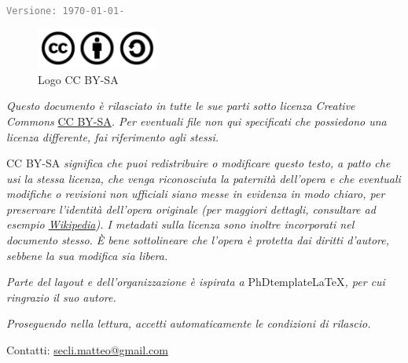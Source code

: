 \frontmatter
\renewcommand{\thepage}{\roman{page}}
\maketitle

\begin{footnotesize}
\null
  \begin{tiny}
  \texttt{\textcolor{gray}{Versione: \version\today-\microversion}}
  \end{tiny}
\vfill

\begin{figure}[hb]
\centering
\includegraphics[width=4cm]{00_frontmatter/figures/cc-by-sa}
\caption[Licenza]{Logo CC BY-SA}
\end{figure}

\emph{Questo documento è rilasciato in tutte le sue parti sotto licenza Creative Commons } \href{http://creativecommons.org/licenses/by-sa/3.0/deed.it}{CC BY-SA}\emph{. Per eventuali file non qui specificati che possiedono una licenza differente, fai riferimento agli stessi.}

CC BY-SA\emph{ significa che puoi redistribuire o modificare questo testo, a patto che usi la stessa licenza, che venga riconosciuta la paternità dell'opera e che eventuali modifiche o revisioni non ufficiali siano messe in evidenza in modo chiaro, per preservare l'identità dell'opera originale (per maggiori dettagli, consultare ad esempio \href{http://it.wikipedia.org/wiki/Licenze_Creative_Commons\#Attribuzione}{Wikipedia}). I metadati sulla licenza sono inoltre incorporati nel documento stesso. \`E bene sottolineare che l'opera è protetta dai diritti d'autore, sebbene la sua modifica sia libera.}

\emph{Parte del layout e dell'organizzazione è ispirata a }PhDtemplateLaTeX\emph{, per cui ringrazio il suo autore.}

\emph{Proseguendo nella lettura, accetti automaticamente le condizioni di rilascio.}

\vskip 10pt

Contatti:  \href{mailto:secli.matteo@gmail.com}{secli.matteo@gmail.com}
\end{footnotesize}

\tableofcontents


\mainmatter
\renewcommand{\thepage}{\arabic{page}}\setcounter{page}{1}